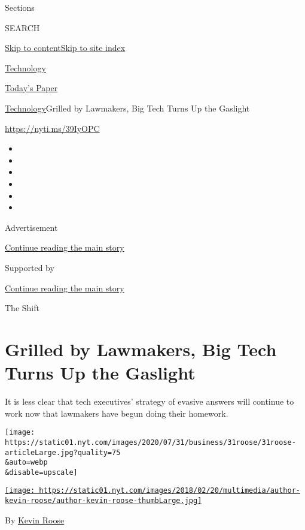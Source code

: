 Sections

SEARCH

\protect\hyperlink{site-content}{Skip to
content}\protect\hyperlink{site-index}{Skip to site index}

\href{https://www.nytimes.com/section/technology}{Technology}

\href{https://myaccount.nytimes.com/auth/login?response_type=cookie\&client_id=vi}{}

\href{https://www.nytimes.com/section/todayspaper}{Today's Paper}

\href{/section/technology}{Technology}\textbar{}Grilled by Lawmakers,
Big Tech Turns Up the Gaslight

\url{https://nyti.ms/39IyOPC}

\begin{itemize}
\item
\item
\item
\item
\item
\item
\end{itemize}

Advertisement

\protect\hyperlink{after-top}{Continue reading the main story}

Supported by

\protect\hyperlink{after-sponsor}{Continue reading the main story}

The Shift

\hypertarget{grilled-by-lawmakers-big-tech-turns-up-the-gaslight}{%
\section{Grilled by Lawmakers, Big Tech Turns Up the
Gaslight}\label{grilled-by-lawmakers-big-tech-turns-up-the-gaslight}}

It is less clear that tech executives' strategy of evasive answers will
continue to work now that lawmakers have begun doing their homework.

\texttt{[image: https://static01.nyt.com/images/2020/07/31/business/31roose/31roose-articleLarge.jpg?quality=75\\\&auto=webp\\\&disable=upscale]}

\href{https://www.nytimes.com/by/kevin-roose}{\texttt{[image: https://static01.nyt.com/images/2018/02/20/multimedia/author-kevin-roose/author-kevin-roose-thumbLarge.jpg]}}

By \href{https://www.nytimes.com/by/kevin-roose}{Kevin Roose}

